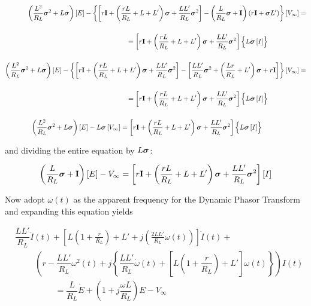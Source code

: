 \begin{align}
	\left(\dfrac{L^2}{R_L}\ndpo{2} + L\dpo\right)\left[E\right] - \left\{\left[r\mathbf{I} + \left(\dfrac{rL}{R_L} + L + L'\right)\dpo + \dfrac{LL'}{R_L}\ndpo{2}\right] - \left(\dfrac{L}{R_L}\dpo + \mathbf{I}\right)\left(r\mathbf{I} + \dpo L'\right)\right\}\left[V_\infty\right] &= \nonumber\\[5mm] & \hspace{-9cm} = \left[r\mathbf{I} + \left(\dfrac{rL}{R_L} + L + L'\right)\dpo + \dfrac{LL'}{R_L}\ndpo{2}\right]\left\{\raisebox{4mm}{} L\dpo\left[I\right] \right\} \\[5mm]
%
	\left(\dfrac{L^2}{R_L}\ndpo{2} + L\dpo\right)\left[E\right] - \left\{\left[r\mathbf{I} + \left(\dfrac{rL}{R_L} + L + L'\right)\dpo + \dfrac{LL'}{R_L}\ndpo{2}\right] - \left[\dfrac{LL'}{R_L}\ndpo{2} + \left(\dfrac{Lr}{R_L} + L'\right)\dpo + r\mathbf{I}\right]\right\}\left[V_\infty\right] &= \nonumber\\[5mm] & \hspace{-9cm} = \left[r\mathbf{I} + \left(\dfrac{rL}{R_L} + L + L'\right)\dpo + \dfrac{LL'}{R_L}\ndpo{2}\right]\left\{\raisebox{4mm}{} L\dpo\left[I\right] \right\} \\[5mm]
%
	&\hspace{-14cm} \left(\dfrac{L^2}{R_L}\ndpo{2} + L\dpo\right)\left[E\right] - L\dpo\left[V_\infty\right] = \left[r\mathbf{I} + \left(\dfrac{rL}{R_L} + L + L'\right)\dpo + \dfrac{LL'}{R_L}\ndpo{2}\right]\left\{\raisebox{4mm}{} L\dpo\left[I\right] \right\}
\end{align}

	\noindent and dividing the entire equation by $L\boldsymbol{\sigma}$:

\begin{equation}
	\left(\dfrac{L}{R_L}\boldsymbol{\sigma} + \mathbf{I}\right)\left[E\right] - V_\infty  = \left[r\mathbf{I} + \left(\dfrac{rL}{R_L} + L + L'\right)\boldsymbol{\sigma} + \dfrac{LL'}{R_L}\boldsymbol{\sigma}^{2}\right]\left[I\right]
\end{equation}

	Now adopt $\omega(t)$ as the apparent frequency for the Dynamic Phasor Transform and expanding this equation yields

\begin{align}
& \dfrac{L L'}{R_L}\ddot{I}(t) + \left[L\left(1 + \frac{r}{R_L}\right) + L' + j\left(\frac{2 L L'}{R_L}\omega(t)\right)\right]\dot{I}(t) + \nonumber\\[5mm]
%
& \hspace{1cm} \left( r - \dfrac{L L'}{R_L}\omega^2(t) + j\left\{\dfrac{L L'}{R_L}\dot{\omega}(t) + \left[L\left(1 + \dfrac{r}{R_L}\right) + L'\right] \omega(t)\right\}\right) I(t) \nonumber\\[5mm]
%
& \hspace{2cm} = \dfrac{L}{R_L}\dot{E} + \left(1 + j\dfrac{\omega L}{R_L}\right)E - V_\infty
\end{align}

